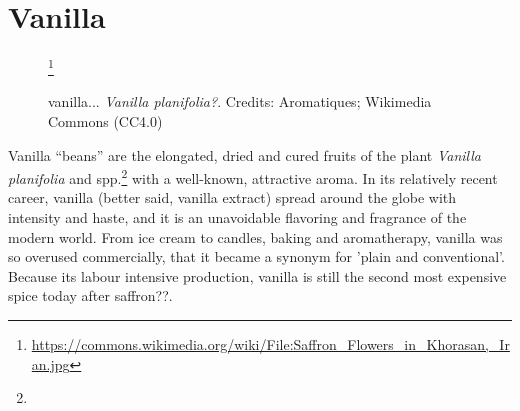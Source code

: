 \section{Vanilla}
\label{sec:vanilla}



\begin{figure}[!ht]
	\vspace{-4ex}
	\centering
	\hfill
	\hfill
	\caption{vanilla... \textit{Vanilla planifolia?}. Credits: Aromatiques; Wikimedia Commons (CC4.0)}\footnote{\url{https://commons.wikimedia.org/wiki/File:Saffron_Flowers_in_Khorasan,_Iran.jpg}}
	\label{fig:vanilla_imgs}
\end{figure}




Vanilla ``beans'' are the elongated, dried and cured fruits of the plant \textit{Vanilla planifolia} and spp.\footnote{} with a well-known, attractive aroma. In its relatively recent career, vanilla (better said, vanilla extract) spread around the globe with intensity and haste, and it is an unavoidable flavoring and fragrance of the modern world. From ice cream to candles, baking and aromatherapy, vanilla was so overused commercially, that it became a synonym for 'plain and conventional'. Because its labour intensive production, vanilla is still the second most expensive spice today after saffron??.

